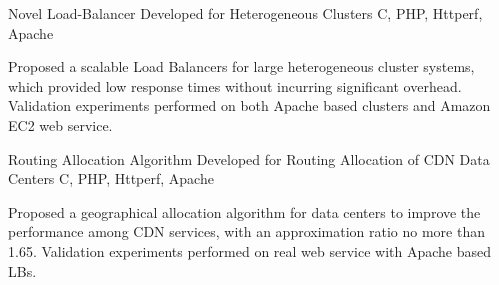 \begin{cventries}
\projentry
{Novel Load-Balancer Developed for Heterogeneous Clusters} %
{C, PHP, Httperf, Apache} %
{ %
\begin{cvitems}
\item{Proposed a scalable Load Balancers for large heterogeneous cluster systems, which provided low response times without incurring significant overhead. Validation experiments performed on both Apache based clusters and Amazon EC2 web service.}
\end{cvitems}
}


\projentry
{Routing Allocation Algorithm Developed for Routing Allocation of CDN Data Centers} %
{C, PHP, Httperf, Apache} %
{ %
\begin{cvitems}
\item{Proposed a geographical allocation algorithm for data centers to improve the performance among CDN services, with an approximation ratio no more than 1.65. Validation experiments performed on real web service with Apache based LBs.}
\end{cvitems}
}



\end{cventries}